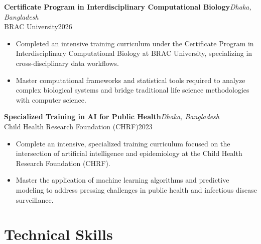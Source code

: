 \documentclass[
  11pt,
  letterpaper,
  DIV=11,
  numbers=noendperiod]{scrartcl}
\begin{document}
\noindent

\begin{minipage}{\linewidth}
\textbf{Certificate Program in Interdisciplinary Computational Biology}\hfill \textit{Dhaka, Bangladesh}\\
BRAC University\hfill 2026
\end{minipage}
\begin{itemize}[nosep,topsep=2pt,leftmargin=1em]
  \item Completed an intensive training curriculum under the Certificate Program in Interdisciplinary Computational Biology at BRAC University, specializing in cross-disciplinary data workflows.
  \item Master computational frameworks and statistical tools required to analyze complex biological systems and bridge traditional life science methodologies with computer science.
\end{itemize}
\vspace{5pt}

\noindent

\begin{minipage}{\linewidth}
\textbf{Specialized Training in AI for Public Health}\hfill \textit{Dhaka, Bangladesh}\\
Child Health Research Foundation (CHRF)\hfill 2023
\end{minipage}
\begin{itemize}[nosep,topsep=2pt,leftmargin=1em]
  \item Complete an intensive, specialized training curriculum focused on the intersection of artificial intelligence and epidemiology at the Child Health Research Foundation (CHRF).
  \item Master the application of machine learning algorithms and predictive modeling to address pressing challenges in public health and infectious disease surveillance.
\end{itemize}
\vspace{5pt}

\section{Technical Skills}\label{technical-skills}
\end{document}
